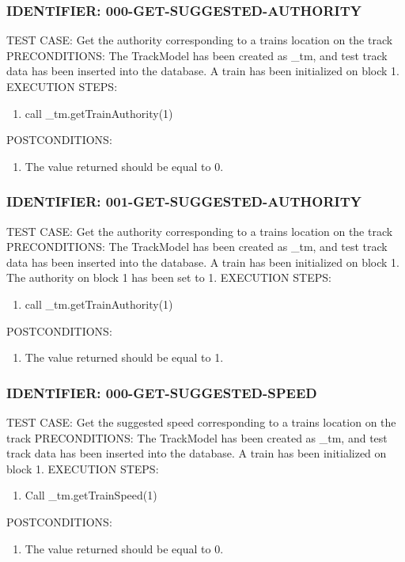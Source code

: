 \documentclass{scrreprt}
\begin{document}
\subsubsection{IDENTIFIER: 000-GET-SUGGESTED-AUTHORITY}
TEST CASE: Get the authority corresponding to a trains location on the track
PRECONDITIONS: The TrackModel has been created as _tm, and test track data has been inserted into the database. A train has been initialized on block 1.
EXECUTION STEPS:
\begin{enumerate}
	\item call _tm.getTrainAuthority(1)
\end{enumerate}
POSTCONDITIONS:
\begin{enumerate}
	\item The value returned should be equal to 0.
\end{enumerate}

\subsubsection{IDENTIFIER: 001-GET-SUGGESTED-AUTHORITY}
TEST CASE: Get the authority corresponding to a trains location on the track
PRECONDITIONS: The TrackModel has been created as _tm, and test track data has been inserted into the database. A train has been initialized on block 1. The authority on block 1 has been set to 1.
EXECUTION STEPS:
\begin{enumerate}
	\item call _tm.getTrainAuthority(1)
\end{enumerate}
POSTCONDITIONS:
\begin{enumerate}
	\item The value returned should be equal to 1.
\end{enumerate}

\subsubsection{IDENTIFIER: 000-GET-SUGGESTED-SPEED}
TEST CASE: Get the suggested speed corresponding to a trains location on the track
PRECONDITIONS: The TrackModel has been created as _tm, and test track data has been inserted into the database. A train has been initialized on block 1.
EXECUTION STEPS:
\begin{enumerate}
	\item Call _tm.getTrainSpeed(1)
\end{enumerate}
POSTCONDITIONS:
\begin{enumerate}
	\item The value returned should be equal to 0.
\end{enumerate}
\end{document}
